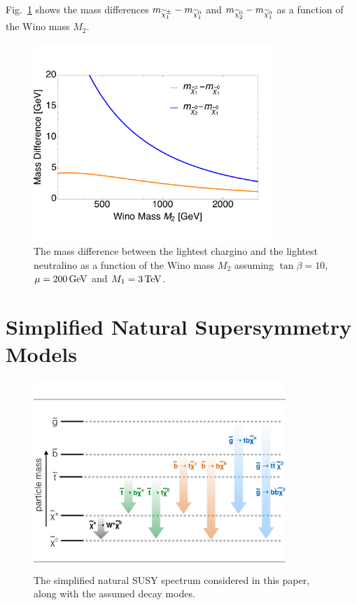 Fig.~\ref{fig:neutralinos} shows the mass differences
$m_{\widetilde{\chi}^{\pm}_1}-m_{\widetilde{\chi}^{0}_1}$ and $m_{\widetilde{\chi}^{0}_2}-m_{\widetilde{\chi}^{0}_1}$ as a function of the Wino mass $M_2$.


\begin{figure}[tb!]
\centering
\includegraphics[width=0.8\textwidth,clip=true,viewport= 0 30 610 450]{figs/theory/neutralinos.pdf}
\caption{The mass difference between the lightest chargino and the
  lightest neutralino as a function of the Wino mass $M_2$
  assuming $\tan\beta=10$, $\mu=200 \,\text{Ge\hspace{-.08em}V}$ and $M_1 = 3 \,\text{Te\hspace{-.08em}V}$.\label{fig:neutralinos}}
\end{figure}

\section{Simplified Natural Supersymmetry Models}
\label{sec:sms}

\begin{figure}[htb!]
\centering
\includegraphics[width=0.85\textwidth]{figs/analysis8TeV/naturalSpectrum.pdf}
\caption{\label{fig:spectrum} The simplified natural SUSY spectrum
  considered in this paper, along with the assumed decay modes.}
\end{figure}

